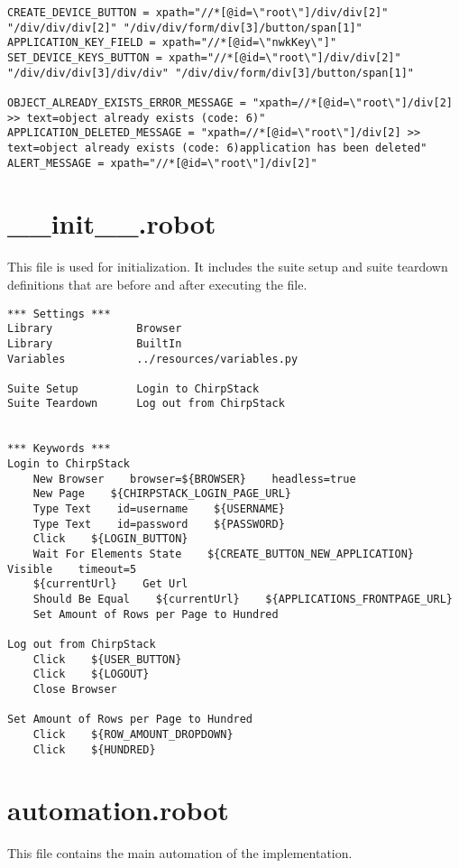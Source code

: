 \begin{verbatim}
CREATE_DEVICE_BUTTON = xpath="//*[@id=\"root\"]/div/div[2]" "/div/div/div[2]" "/div/div/form/div[3]/button/span[1]"
APPLICATION_KEY_FIELD = xpath="//*[@id=\"nwkKey\"]"
SET_DEVICE_KEYS_BUTTON = xpath="//*[@id=\"root\"]/div/div[2]" "/div/div/div[3]/div/div" "/div/div/form/div[3]/button/span[1]"

OBJECT_ALREADY_EXISTS_ERROR_MESSAGE = "xpath=//*[@id=\"root\"]/div[2] >> text=object already exists (code: 6)"
APPLICATION_DELETED_MESSAGE = "xpath=//*[@id=\"root\"]/div[2] >> text=object already exists (code: 6)application has been deleted"
ALERT_MESSAGE = xpath="//*[@id=\"root\"]/div[2]"
\end{verbatim}


\section{\_\_init\_\_.robot}

This file is used for initialization.
It includes the suite setup and suite teardown definitions that are before and after executing the  file.

\begin{verbatim}
*** Settings ***
Library             Browser
Library             BuiltIn
Variables           ../resources/variables.py

Suite Setup         Login to ChirpStack
Suite Teardown      Log out from ChirpStack


*** Keywords ***
Login to ChirpStack
    New Browser    browser=${BROWSER}    headless=true
    New Page    ${CHIRPSTACK_LOGIN_PAGE_URL}
    Type Text    id=username    ${USERNAME}
    Type Text    id=password    ${PASSWORD}
    Click    ${LOGIN_BUTTON}
    Wait For Elements State    ${CREATE_BUTTON_NEW_APPLICATION}    Visible    timeout=5
    ${currentUrl}    Get Url
    Should Be Equal    ${currentUrl}    ${APPLICATIONS_FRONTPAGE_URL}
    Set Amount of Rows per Page to Hundred

Log out from ChirpStack
    Click    ${USER_BUTTON}
    Click    ${LOGOUT}
    Close Browser

Set Amount of Rows per Page to Hundred
    Click    ${ROW_AMOUNT_DROPDOWN}
    Click    ${HUNDRED}

\end{verbatim}

\section{automation.robot}
This file contains the main automation of the implementation.

